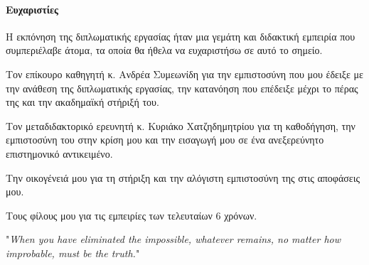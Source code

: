 {	\newpage
	\paragraph{Ευχαριστίες}
	Η εκπόνηση της διπλωματικής εργασίας ήταν μια γεμάτη και διδακτική εμπειρία που συμπεριέλαβε άτομα, τα οποία θα ήθελα να ευχαριστήσω σε αυτό το σημείο.
	
	Τον επίκουρο καθηγητή κ. Ανδρέα Συμεωνίδη για την εμπιστοσύνη  που μου έδειξε με την ανάθεση της διπλωματικής εργασίας, την κατανόηση που επέδειξε μέχρι το πέρας της και την ακαδημαϊκή στήριξή του.
	
	Τον μεταδιδακτορικό ερευνητή κ. Κυριάκο Χατζηδημητρίου για τη καθοδήγηση, την εμπιστοσύνη του στην κρίση μου και την εισαγωγή μου σε ένα ανεξερεύνητο επιστημονικό αντικειμένο.
	
	Την οικογένειά μου για τη στήριξη και την αλόγιστη εμπιστοσύνη της στις αποφάσεις μου.
	
	Τους φίλους μου για τις εμπειρίες των τελευταίων 6 χρόνων.
	\newpage
}


\tableofcontents
\listoffigures
\listoftables

\pagebreak
\thispagestyle{empty}
\hspace{0pt}
\vfill
\begin{flushright}
"\textit{When you have eliminated the impossible, whatever remains, no matter how improbable, must be the truth.}"
\\[8pt]
\end{flushright}
\vfill
\hspace{0pt}
\pagebreak




